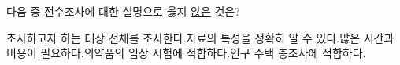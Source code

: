 다음 중 전수조사에 대한 설명으로 옳지 \underline{않은} 것은?
\begin{choicesv}{조사하고자 하는 대상 전체를 조사한다.}{자료의 특성을 정확히 알 수 있다.}{많은 시간과 비용이 필요하다.}{의약품의 임상 시험에 적합하다.}{인구 주택 총조사에 적합하다.}\end{choicesv}
